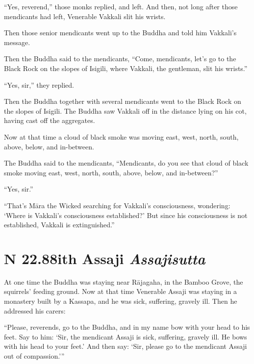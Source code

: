 \documentclass[12pt,openany]{book}%
\newcommand*{\suttatitleacronym}[1]{\smaller[2]{#1}\vspace*{.3em}}
\newcommand*{\suttatitletranslation}[1]{\linebreak{#1}}
\newcommand*{\suttatitleroot}[1]{\linebreak\smaller[2]\itshape{#1}}
\newcommand*{\tocacronym}[1]{\hspace*{-3.3em}{#1}\quad}
\newcommand*{\toctranslation}[1]{#1}
\newcommand*{\tocroot}[1]{(\textit{#1})}
\begin{document}
“Yes, reverend,” those monks replied, and left. And then, not long after those mendicants had left, Venerable Vakkali slit his wrists. 

Then those senior mendicants went up to the Buddha and told him Vakkali’s message. 

Then the Buddha said to the mendicants, “Come, mendicants, let’s go to the Black Rock on the slopes of Isigili, where Vakkali, the gentleman, slit his wrists.” 

“Yes, sir,” they replied. 

Then the Buddha together with several mendicants went to the Black Rock on the slopes of Isigili. The Buddha saw Vakkali off in the distance lying on his cot, having cast off the aggregates. 

Now at that time a cloud of black smoke was moving east, west, north, south, above, below, and in-between. 

The Buddha said to the mendicants, “Mendicants, do you see that cloud of black smoke moving east, west, north, south, above, below, and in-between?” 

“Yes, sir.” 

“That’s \textsanskrit{Māra} the Wicked searching for Vakkali’s consciousness, wondering: ‘Where is Vakkali’s consciousness established?’ But since his consciousness is not established, Vakkali is extinguished.” 

%
\section*{{\suttatitleacronym SN 22.88}{\suttatitletranslation With Assaji }{\suttatitleroot Assajisutta}}
\addcontentsline{toc}{section}{\tocacronym{SN 22.88} \toctranslation{With Assaji } \tocroot{Assajisutta}}

At one time the Buddha was staying near \textsanskrit{Rājagaha}, in the Bamboo Grove, the squirrels’ feeding ground. Now at that time Venerable Assaji was staying in a monastery built by a Kassapa, and he was sick, suffering, gravely ill. Then he addressed his carers: 

“Please, reverends, go to the Buddha, and in my name bow with your head to his feet. Say to him: ‘Sir, the mendicant Assaji is sick, suffering, gravely ill. He bows with his head to your feet.’ And then say: ‘Sir, please go to the mendicant Assaji out of compassion.’” 
\end{document}

